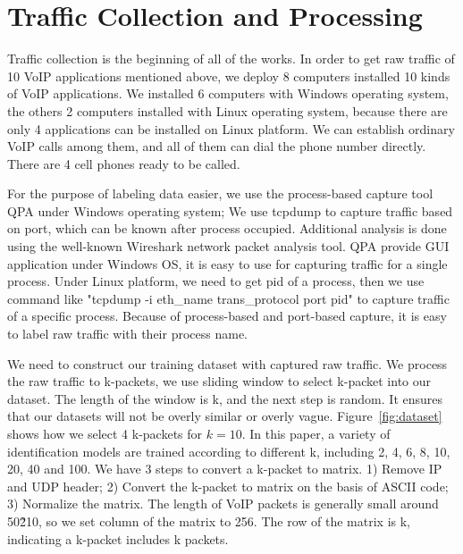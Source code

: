 \documentclass[conference]{IEEEtran}
\begin{document}
\section{Traffic Collection and Processing}
\label{sec:trafficcollectionandprocessing}
Traffic collection is the beginning of all of the works. In order to get raw traffic of 10 VoIP applications mentioned above, we deploy 8 computers installed 10 kinds of VoIP applications. We installed 6 computers with Windows operating system, the others 2 computers installed with Linux operating system, because there are only 4 applications can be installed on Linux platform. We can establish ordinary VoIP calls among them, and all of them can dial the phone number directly. There are 4 cell phones ready to be called.



For the purpose of labeling data easier, we use the process-based capture tool QPA under Windows operating system; We use tcpdump to capture traffic based on port, which can be known after process occupied. Additional analysis is done using the well-known Wireshark network packet analysis tool. QPA provide GUI application under Windows OS, it is easy to use for capturing traffic for a single process. Under Linux platform, we need to get pid of a process, then we use command like "tcpdump -i eth\_name trans\_protocol port pid" to capture traffic of a specific process. Because of process-based and port-based capture, it is easy to label raw traffic with their process name.

We need to construct our training dataset with captured raw traffic. We process the raw traffic to k-packets, we use sliding window to select k-packet into our dataset. The length of the window is k, and the next step is random. It ensures that our datasets will not be overly similar or overly vague. Figure~\ref{fig:dataset} shows how we select 4 k-packets for $k=10$. In this paper, a variety of identification models are trained according to different k, including 2, 4, 6, 8, 10, 20, 40 and 100. We have 3 steps to convert a k-packet to matrix. 1) Remove IP and UDP header; 2) Convert the k-packet to matrix on the basis of ASCII code; 3) Normalize the matrix. The length of VoIP packets is generally small around 50\~210, so we set column of the matrix to 256. The row of the matrix is k, indicating a k-packet includes k packets.
\end{document}
